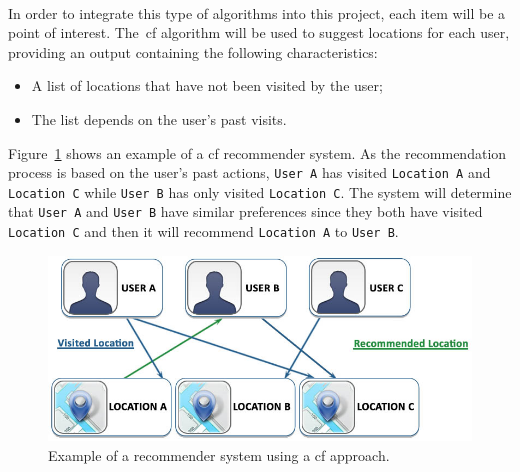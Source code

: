 \\
In order to integrate this type of algorithms into this project, each item will be a point of interest. The~\gls{cf} algorithm will be used to suggest locations for each user, providing an output containing the following characteristics:
\begin{itemize}
 \item A list of locations that have not been visited by the user;
 \item The list depends on the user's past visits.
\end{itemize}
Figure~\ref{fig:exampleIBF} shows an example of a \gls{cf} recommender system. As the recommendation process is based on the user's past actions, \verb"User A" has visited \verb"Location A" and \verb"Location C" while \verb"User B" has only visited \verb"Location C". The system will determine that \verb"User A" and \verb"User B" have similar preferences since they both have visited \verb"Location C" and then it will recommend \verb"Location A" to \verb"User B".\\
\begin{figure}[h!]
 \centering
   \includegraphics[width=12 cm]{./images/examples/example_item_based_filtering.jpg}
   \caption{Example of a recommender system using a \gls{cf} approach.}
   \label{fig:exampleIBF}
\end{figure}

